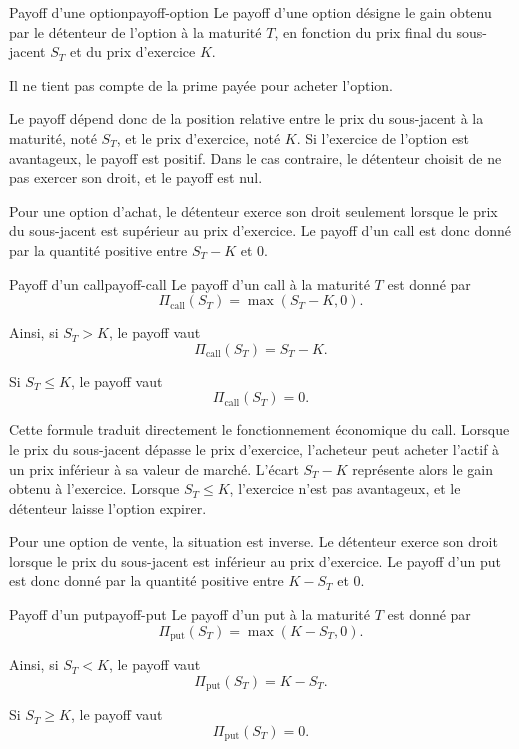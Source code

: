 \documentclass[12pt,a4paper]{report}
\begin{document}
\begin{definition}{Payoff d'une option}{payoff-option}
Le payoff d'une option désigne le gain obtenu par le détenteur de l'option à la maturité $T$, en fonction du prix final du sous-jacent $S_T$ et du prix d'exercice $K$.

Il ne tient pas compte de la prime payée pour acheter l'option.
\end{definition}

Le payoff dépend donc de la position relative entre le prix du sous-jacent à la maturité, noté $S_T$, et le prix d'exercice, noté $K$. Si l'exercice de l'option est avantageux, le payoff est positif. Dans le cas contraire, le détenteur choisit de ne pas exercer son droit, et le payoff est nul.

Pour une option d'achat, le détenteur exerce son droit seulement lorsque le prix du sous-jacent est supérieur au prix d'exercice. Le payoff d'un call est donc donné par la quantité positive entre $S_T - K$ et $0$.

\begin{definition}{Payoff d'un call}{payoff-call}
Le payoff d'un call à la maturité $T$ est donné par
\[
\Pi_{\text{call}}(S_T) = \max(S_T - K, 0).
\]

Ainsi, si $S_T > K$, le payoff vaut
\[
\Pi_{\text{call}}(S_T) = S_T - K.
\]

Si $S_T \leq K$, le payoff vaut
\[
\Pi_{\text{call}}(S_T) = 0.
\]
\end{definition}

Cette formule traduit directement le fonctionnement économique du call. Lorsque le prix du sous-jacent dépasse le prix d'exercice, l'acheteur peut acheter l'actif à un prix inférieur à sa valeur de marché. L'écart $S_T - K$ représente alors le gain obtenu à l'exercice. Lorsque $S_T \leq K$, l'exercice n'est pas avantageux, et le détenteur laisse l'option expirer.

Pour une option de vente, la situation est inverse. Le détenteur exerce son droit lorsque le prix du sous-jacent est inférieur au prix d'exercice. Le payoff d'un put est donc donné par la quantité positive entre $K - S_T$ et $0$.

\begin{definition}{Payoff d'un put}{payoff-put}
Le payoff d'un put à la maturité $T$ est donné par
\[
\Pi_{\text{put}}(S_T) = \max(K - S_T, 0).
\]

Ainsi, si $S_T < K$, le payoff vaut
\[
\Pi_{\text{put}}(S_T) = K - S_T.
\]

Si $S_T \geq K$, le payoff vaut
\[
\Pi_{\text{put}}(S_T) = 0.
\]
\end{definition}
\end{document}
